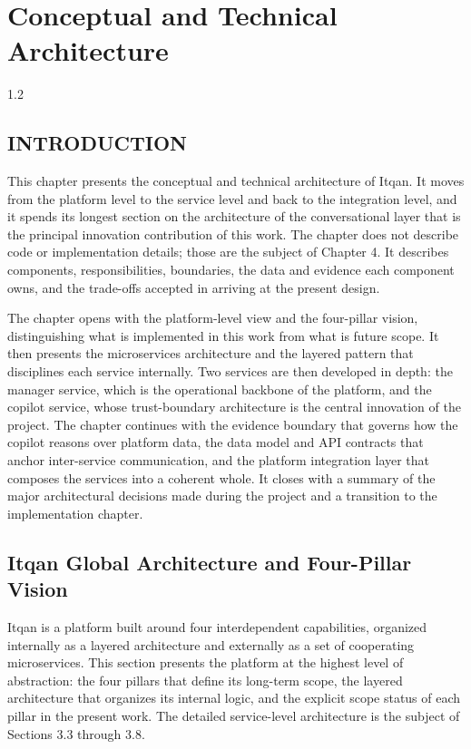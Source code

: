 \chapter{Conceptual and Technical Architecture}
\begin{spacing}{1.2}
\minitoc
\thispagestyle{MyStyle}
\end{spacing}
\newpage

\section{INTRODUCTION}
This chapter presents the conceptual and technical architecture of Itqan. It moves from the platform level to the service level and back to the integration level, and it spends its longest section on the architecture of the conversational layer that is the principal innovation contribution of this work. The chapter does not describe code or implementation details; those are the subject of Chapter 4. It describes components, responsibilities, boundaries, the data and evidence each component owns, and the trade-offs accepted in arriving at the present design.

The chapter opens with the platform-level view and the four-pillar vision, distinguishing what is implemented in this work from what is future scope. It then presents the microservices architecture and the layered pattern that disciplines each service internally. Two services are then developed in depth: the manager service, which is the operational backbone of the platform, and the copilot service, whose trust-boundary architecture is the central innovation of the project. The chapter continues with the evidence boundary that governs how the copilot reasons over platform data, the data model and API contracts that anchor inter-service communication, and the platform integration layer that composes the services into a coherent whole. It closes with a summary of the major architectural decisions made during the project and a transition to the implementation chapter.

\section{Itqan Global Architecture and Four-Pillar Vision}
Itqan is a platform built around four interdependent capabilities, organized internally as a layered architecture and externally as a set of cooperating microservices. This section presents the platform at the highest level of abstraction: the four pillars that define its long-term scope, the layered architecture that organizes its internal logic, and the explicit scope status of each pillar in the present work. The detailed service-level architecture is the subject of Sections 3.3 through 3.8.

